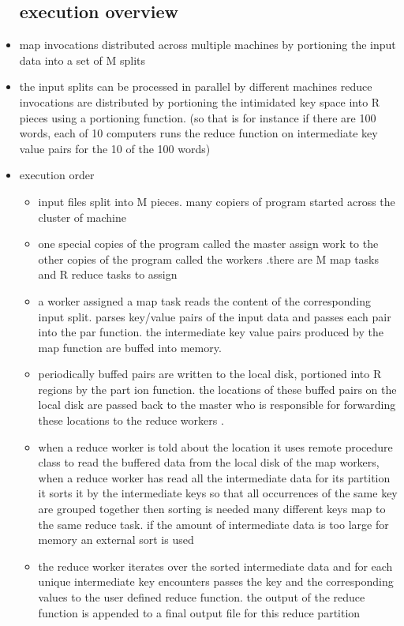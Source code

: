 \documentclass{article}
\begin{document}
\begin{itemize}
\subsection{execution overview}
\item map invocations distributed across multiple machines by portioning the input data into a set of M splits 
\item the input splits can be processed in parallel by different machines 
\itme reduce invocations are distributed by portioning the intimidated key space into R pieces using a portioning function.  (so that is for instance if there are 100 words, each of 10 computers runs the reduce function on intermediate key value pairs for the 10 of the 100 words) 
\item execution order 
\begin{itemize}
    \item input files split into M pieces. many copiers of program started across the cluster of machine
    \item one special copies of the program called the master assign work to the other copies of the program called the workers .there are M map tasks and R reduce tasks to assign 
    \item a worker assigned a map task reads the content of the corresponding input split. parses key/value pairs of the input data and passes each pair into the par function. the intermediate key value pairs produced by the map function are buffed into memory.
    \item periodically buffed pairs are written to the local disk, portioned into R regions by the part ion function. the locations of these buffed pairs on the local disk are passed back to the master who is responsible for forwarding these locations to the reduce workers .
    \item when a reduce worker is told about the location it uses remote procedure class to read the buffered data from the local disk of the map workers, when a reduce worker has read all the intermediate data for its partition it sorts it by the intermediate keys so that all occurrences of the same key are grouped together then sorting is needed many different keys map to the same reduce task. if the amount of intermediate data is too large for memory an external sort is used 
    \item the reduce worker iterates over the sorted intermediate data and for each unique intermediate key encounters passes the key and the corresponding values to the user defined reduce function. the output of the reduce function is appended to a final output file for this reduce partition 

\end{itemize}
\end{itemize}
\end{document}
